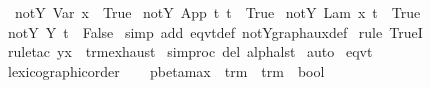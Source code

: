 \begin{isabellebody}
\isanewline
\ \ {\isachardoublequoteopen}not{\isacharunderscore}Y\ {\isacharparenleft}Var\ x{\isacharparenright}\ {\isacharequal}\ True{\isachardoublequoteclose}\isanewline
{\isacharbar}\ {\isachardoublequoteopen}not{\isacharunderscore}Y\ {\isacharparenleft}App\ t{}\ t{}{\isacharparenright}\ {\isacharequal}\ True{\isachardoublequoteclose}\isanewline
{\isacharbar}\ {\isachardoublequoteopen}not{\isacharunderscore}Y\ {\isacharparenleft}Lam\ {\isacharbrackleft}x{\isacharbrackright}{\isachardot}\ t{\isacharparenright}\ {\isacharequal}\ True{\isachardoublequoteclose}\isanewline
{\isacharbar}\ {\isachardoublequoteopen}not{\isacharunderscore}Y\ {\isacharparenleft}Y\ t{\isacharparenright}\ {\isacharequal}\ False{\isachardoublequoteclose}\isanewline
%
\isadelimproof
%
\endisadelimproof
%
\isatagproof
{}\isamarkupfalse%
\ {\isacharparenleft}simp\ add{\isacharcolon}\ eqvt{\isacharunderscore}def\ not{\isacharunderscore}Y{\isacharunderscore}graph{\isacharunderscore}aux{\isacharunderscore}def{\isacharparenright}\isanewline
{}\isamarkupfalse%
\ {\isacharparenleft}rule\ TrueI{\isacharparenright}\isanewline
{}\isamarkupfalse%
\ {\isacharparenleft}rule{\isacharunderscore}tac\ y{\isacharequal}{\isachardoublequoteopen}x{\isachardoublequoteclose}\ \ trm{\isachardot}exhaust{\isacharparenright}\isanewline
{}\isamarkupfalse%
\ {\isacharbrackleft}{\isacharbrackleft}simproc\ del{\isacharcolon}\ alpha{\isacharunderscore}lst{\isacharbrackright}{\isacharbrackright}\isanewline
{}\isamarkupfalse%
\ auto%
\endisatagproof
{\isafoldproof}%
%
\isadelimproof
\isanewline
%
\endisadelimproof
{}\isamarkupfalse%
\ {\isacharparenleft}eqvt{\isacharparenright}%
\isadelimproof
\ %
\endisadelimproof
%
\isatagproof
{}\isamarkupfalse%
\ lexicographic{\isacharunderscore}order%
\endisatagproof
{\isafoldproof}%
%
\isadelimproof
%
\endisadelimproof
\isanewline
\isanewline
{}\isamarkupfalse%
\ \isanewline
\ \ pbeta{\isacharunderscore}max\ {\isacharcolon}{\isacharcolon}\ {\isachardoublequoteopen}trm\ {\isasymRightarrow}\ trm\ {\isasymRightarrow}\ bool{\isachardoublequoteclose}\ {\isacharparenleft}{\isachardoublequoteopen}{\isacharunderscore}\ {\isachargreater}{\isachargreater}{\isachargreater}\ {\isacharunderscore}{\isachardoublequoteclose}\ {\isacharbrackleft}{}{}{\isacharcomma}{}{}{\isacharbrackright}\ {}{}{\isacharparenright}\isanewline

\end{isabellebody}
